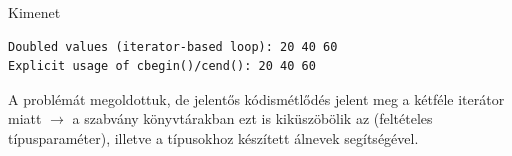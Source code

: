 \begin{frame}[fragile]
    \begin{exampleblock}{}
        \scriptsize
        
    \end{exampleblock}
            \begin{block}{Kimenet}
        \vspace{-.3cm}
        \scriptsize
        \begin{verbatim}
Doubled values (iterator-based loop): 20 40 60 
Explicit usage of cbegin()/cend(): 20 40 60
\end{verbatim}
    \vspace{-.3cm}
    \end{block}
\end{frame}

\begin{frame}
    A problémát megoldottuk, de jelentős kódismétlődés jelent meg a kétféle iterátor miatt $\to$ a szabvány könyvtárakban ezt is kiküszöbölik az  (feltételes típusparaméter), illetve a típusokhoz készített álnevek segítségével.
\end{frame}